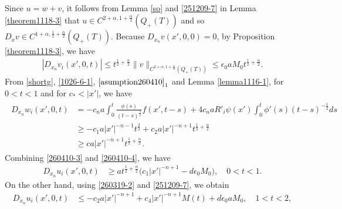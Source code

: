 \documentclass{amsart}
\numberwithin{equation}{section}
\newcommand{\ep}{{ \epsilon  }}
\newcommand {\al}{\alpha}
\newenvironment{pfthm-NS}{{\par\noindent
            \textbf{Proof of Theorem \ref{maintheorem(NS)}}\quad}}{\hfill $\square$}
\begin{document}
\begin{pfthm-NS}
\\
Since $u = w + v$, it follows from Lemma  \ref{so} and \eqref{251209-7} in Lemma  \ref{theorem1118-3} that $u \in C^{2+\al, 1 +\frac{\al}2}(Q_+ (T))$ and    so $D_x v \in C^{1+\al, \frac12+\frac{\al}2}(Q_+ (T))$. Because $D_{x_n} v(x', 0, 0) = 0$, by Proposition \ref{theorem1118-3},  we have
\begin{align}\label{260410-3}
|D_{x_n} v_i(x', 0, t)| \leq t^{\frac12 +\frac{\al}2} \|v\|_{C^{2+\al, 1 +\frac{\al}2} (Q_+ (T))} \leq \ep_0 a M_0 t^{\frac12 +\frac{\al}2}.
\end{align}
From \eqref{shortg},   \eqref{1026-6-1}, $\eqref{asumption260410}_1$  and Lemma \ref{lemma1116-1}, for $ 0 < t< 1$ and for $ c_* < |x'|$,  we have 
\begin{align} \label{260410-4} 
\begin{split}
D_{x_n} w_i (x', 0,t)  & =  
   - c_n a  \int_0^t    \frac{ \phi (s)}{(t -s)^\frac32}       f(x', t-s)  +  4 c_n a  R'_i \psi (x') \int_{0}^t   \phi' (s)     (t-s)^{-\frac12}  ds\\
& \geq  - c_1 a  |x'|^{-n -1}  t^\frac32 + c_2 a  |x'|^{-n+1} t^{\frac12 +\frac{\al}2}\\
& \geq  c  a |x'|^{-n+1} t^{\frac12 +\frac{\al}2}.
\end{split}
\end{align}
 Combining \eqref{260410-3} and \eqref{260410-4}, we have 
\begin{align}
\label{1118-7} D_{x_n} u_i (x', 0, t) &\geq  a t^{\frac12 + \frac{\al}2} \Big( c_1  |x'|^{-n+1} -   d \ep_0 M_0\Big), \quad 0 < t < 1.
\end{align}
On the other hand, using   \eqref{260319-2} and \eqref{251209-7}, we obtain
\begin{align}
\label{1118-8} D_{x_n} u_i (x', 0, t) &\leq - c_2 a   |x'|^{-n +1}   + c_4 |x'|^{-n +1} M(t) +   d \ep_0 a M_0, \quad 1 < t < 2,
\end{align}


\end{pfthm-NS}
\end{document}
